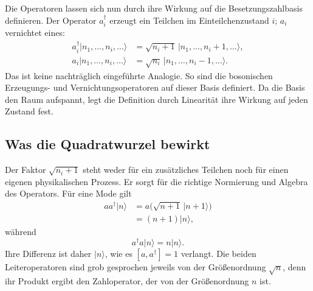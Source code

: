 Die Operatoren lassen sich nun durch ihre Wirkung auf die Besetzungszahlbasis definieren. Der Operator \(a_i^\dagger\) erzeugt ein Teilchen im Einteilchenzustand \(i\); \(a_i\) vernichtet eines:
\begin{align}
a_i^\dagger|n_1,\ldots,n_i,\ldots\rangle
&=\sqrt{n_i+1}\,|n_1,\ldots,n_i+1,\ldots\rangle, \\
a_i|n_1,\ldots,n_i,\ldots\rangle
&=\sqrt{n_i}\,|n_1,\ldots,n_i-1,\ldots\rangle.
\end{align}
Das ist keine nachträglich eingeführte Analogie. So sind die bosonischen Erzeugungs- und Vernichtungsoperatoren auf dieser Basis definiert. Da die Basis den Raum aufspannt, legt die Definition durch Linearität ihre Wirkung auf jeden Zustand fest.

\begin{classroomqa}
\end{classroomqa}

\subsection{Was die Quadratwurzel bewirkt}

Der Faktor \(\sqrt{n_i+1}\) steht weder für ein zusätzliches Teilchen noch für einen eigenen physikalischen Prozess. Er sorgt für die richtige Normierung und Algebra des Operators. Für eine Mode gilt
\begin{align}
a a^\dagger|n\rangle
&=a\bigl(\sqrt{n+1}\,|n+1\rangle\bigr) \\
&=(n+1)|n\rangle,
\end{align}
während
\begin{equation}
a^\dagger a|n\rangle=n|n\rangle.
\end{equation}
Ihre Differenz ist daher \(|n\rangle\), wie es \([a,a^\dagger]=1\) verlangt. Die beiden Leiteroperatoren sind grob gesprochen jeweils von der Größenordnung \(\sqrt n\), denn ihr Produkt ergibt den Zahloperator, der von der Größenordnung \(n\) ist.

\begin{classroomqa}
\end{classroomqa}

